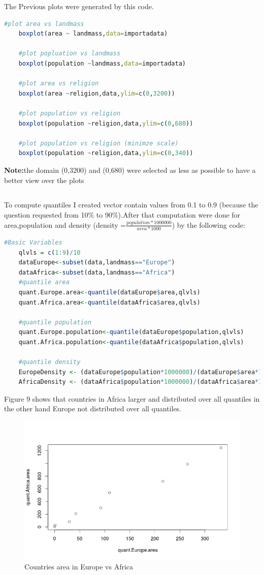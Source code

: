 \documentclass{article}
\begin{document}
	The Previous plots were generated by this code.
	\begin{lstlisting}[language=R]
	#plot area vs landmass
	boxplot(area ~ landmass,data=importadata)
	
	#plot popluation vs landmass
	boxplot(population ~landmass,data=importadata)
	
	#plot area vs religion
	boxplot(area ~religion,data,ylim=c(0,3200))
	
	#plot population vs religion
	boxplot(population ~religion,data,ylim=c(0,680))
	
	#plot population vs religion (minimze scale)
	boxplot(population ~religion,data,ylim=c(0,340))
	\end{lstlisting}
	\textbf{Note:}the domain (0,3200) and (0,680) were selected as less as possible to have a better view over the plots
	\subsection*{}
	To compute quantiles I created vector contain values from 0.1 to 0.9 (because the question requested from 10\% to 90\%).After that computation were done for area,population and density (density =\(\frac{population*1000000}{area*1000}\)) by the following code:
	\begin{lstlisting}[language=R]
	#Basic Variables
	qlvls = c(1:9)/10
	dataEurope<-subset(data,landmass=="Europe")
	dataAfrica<-subset(data,landmass=="Africa")
	#quantile area 
	quant.Europe.area<-quantile(dataEurope$area,qlvls)
	quant.Africa.area<-quantile(dataAfrica$area,qlvls)
	
	#quantile population
	quant.Europe.population<-quantile(dataEurope$population,qlvls)
	quant.Africa.population<-quantile(dataAfrica$population,qlvls)
	
	#quantile density
	EuropeDensity <- (dataEurope$population*1000000)/(dataEurope$area*1000)
	AfricaDensity <- (dataAfrica$population*1000000)/(dataAfrica$area*1000)
	\end{lstlisting}
	Figure 9 shows that countries in Africa larger and distributed over all quantiles in the other hand Europe not distributed over all quantiles.
	\begin{figure}[H]
		\begin{center}
			\includegraphics[scale=0.7]{qqplotarea.png}
		\end{center}
		\caption{Countries area in Europe vs Africa}
	\end{figure}
\end{document}
